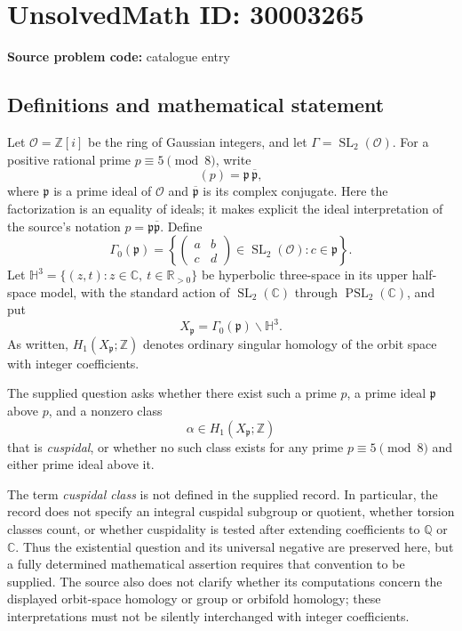\documentclass[11pt]{article}
\newcommand{\Z}{\mathbb{Z}}
\newcommand{\Q}{\mathbb{Q}}
\newcommand{\R}{\mathbb{R}}
\newcommand{\C}{\mathbb{C}}
\begin{document}
\section*{UnsolvedMath ID: 30003265}
\textbf{Source problem code:} catalogue entry
\subsection{Definitions and mathematical statement}
Let \(\mathcal O=\Z[i]\) be the ring of Gaussian integers, and let \(\Gamma=\operatorname{SL}_2(\mathcal O)\). For a positive rational prime \(p\equiv5\pmod8\), write
\[
(p)=\mathfrak p\,\overline{\mathfrak p},
\]
where \(\mathfrak p\) is a prime ideal of \(\mathcal O\) and \(\overline{\mathfrak p}\) is its complex conjugate. Here the factorization is an equality of ideals; it makes explicit the ideal interpretation of the source's notation \(p=\mathfrak p\overline{\mathfrak p}\). Define
\[
\Gamma_0(\mathfrak p)=
\left\{
\begin{pmatrix}a&b\\c&d\end{pmatrix}
\in\operatorname{SL}_2(\mathcal O):c\in\mathfrak p
\right\}.
\]
Let \(\mathbb H^3=\{(z,t):z\in\C,\ t\in\R_{>0}\}\) be hyperbolic three-space in its upper half-space model, with the standard action of \(\operatorname{SL}_2(\C)\) through \(\operatorname{PSL}_2(\C)\), and put
\[
X_{\mathfrak p}=\Gamma_0(\mathfrak p)\backslash\mathbb H^3.
\]
As written, \(H_1(X_{\mathfrak p};\Z)\) denotes ordinary singular homology of the orbit space with integer coefficients.

The supplied question asks whether there exist such a prime \(p\), a prime ideal \(\mathfrak p\) above \(p\), and a nonzero class
\[
\alpha\in H_1(X_{\mathfrak p};\Z)
\]
that is \emph{cuspidal}, or whether no such class exists for any prime \(p\equiv5\pmod8\) and either prime ideal above it.

The term \emph{cuspidal class} is not defined in the supplied record. In particular, the record does not specify an integral cuspidal subgroup or quotient, whether torsion classes count, or whether cuspidality is tested after extending coefficients to \(\Q\) or \(\C\). Thus the existential question and its universal negative are preserved here, but a fully determined mathematical assertion requires that convention to be supplied. The source also does not clarify whether its computations concern the displayed orbit-space homology or group or orbifold homology; these interpretations must not be silently interchanged with integer coefficients.
\end{document}
